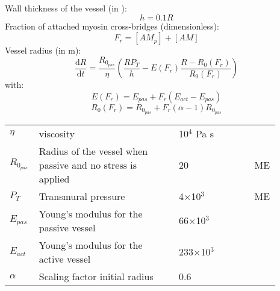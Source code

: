 Wall thickness of the vessel (in \um):
\begin{equation} \label{eq:h2}
h=0.1R
\end{equation}
%
Fraction of attached myosin cross-bridges (dimensionless):
\begin{equation}
F_r = [AM_p] + [AM]
\end{equation}
%
Vessel radius (in m):
\begin{equation} \label{eq:dRdt2e}
\dfrac{\mathrm{d}R}{\mathrm{d}t}= \frac{R_{0_{pas}}}{\eta}\left(   \frac{ R P_{T}}{h}  - E(F_r) \frac{R - R_0(F_r)}{R_0(F_r)} \right)
\end{equation}
%
with:
\begin{equation}
E(F_r)= E_{pas} + F_r \left(E_{act} - E_{pas} \right)
\end{equation}
%
\begin{equation}
R_0(F_r)=R_{0_{pas}} + F_r (\alpha -1) R_{0_{pas}}
\end{equation}
%
\newpage
\begin{table}[t!]
\centering
\begin{tabular}{ p{0.09\linewidth}  >{\footnotesize} p{0.5\linewidth}  >{\footnotesize} p{0.27\linewidth} >{\footnotesize} p{0.03\linewidth} }
\hline
$\eta   $				& viscosity															& 10$^4$ Pa s 		&  \cite{Koenigsberger2006}\\
$R_{0_{pas}}$			& Radius of the vessel when passive and no stress is applied		& 20  \um 		& ME \\
$P_T$					& Transmural pressure												& 4$\times$10$^3$ \Pa		& ME \\
${E}_{pas}$				& Young's modulus for the passive vessel								& 66$\times$10$^3$ \Pa 		&  \cite{Gore1985}\\
${E}_{act}$				& Young's modulus for the active vessel								& 233$\times$10$^3$ \Pa 	& \cite{Gore1985}\\
$\alpha$				& Scaling factor initial radius										& 0.6    		& \cite{Gore1985}\\
\hline
\end{tabular}
\label{tab:crossbridge}
\end{table}
\par
\par
\par
\par 
$~$
$~$
$~$
$~$
$~$
